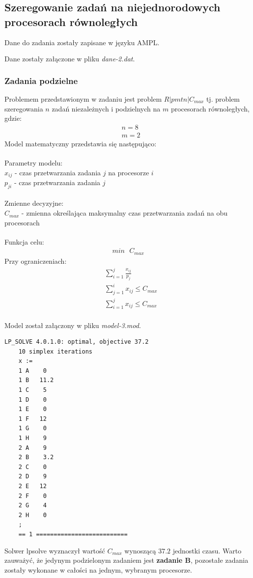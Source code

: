 \documentclass[
    12pt, %
]{../fphw}
\begin{document}
\subsection{Szeregowanie zadań na niejednorodowych procesorach równoległych}
Dane do zadania zostały zapisane w języku AMPL.

Dane zostały załączone w pliku \textit{dane-2.dat}.
\subsubsection{Zadania podzielne}
Problemem przedstawionym w zadaniu jest problem \(R|pmtn|C_{max}\)
tj. problem szeregowania \(n\) zadań niezależnych i podzielnych
na \(m\) procesorach równoległych, gdzie:
\begin{align*}
     & n = 8 \\
     & m = 2
\end{align*}
Model matematyczny przedstawia się następująco: \\ \\
Parametry modelu: \\
\(x_{ij}\) - czas przetwarzania zadania \(j\) na procesorze \(i\) \\
\(p_{ji}\) - czas przetwarzania zadania \(j\) \\ \\
Zmienne decyzyjne: \\
\(C_{max}\) - zmienna określająca maksymalny czas przetwarzania zadań na obu procesorach \\ \\
Funkcja celu: \\
\begin{align*}
    min \text{ } C_{max}
\end{align*}
Przy ograniczeniach: \\
\begin{align*}
     & \sum^j_{i=1} \frac{x_{ij}}{p_j}  \\
     & \sum^i_{j=1} x_{ij} \leq C_{max} \\
     & \sum^j_{i=1} x_{ij} \leq C_{max} \\
\end{align*}


Model został załączony w pliku \textit{model-3.mod}.


\begin{lstlisting}[caption=Rozwiązanie znalezione solwerem lpsolve]
    LP_SOLVE 4.0.1.0: optimal, objective 37.2
    10 simplex iterations
    x :=
    1 A    0
    1 B   11.2
    1 C    5
    1 D    0
    1 E    0
    1 F   12
    1 G    0
    1 H    9
    2 A    9
    2 B    3.2
    2 C    0
    2 D    9
    2 E   12
    2 F    0
    2 G    4
    2 H    0
    ;
    == 1 ==========================
\end{lstlisting}
Solwer lpsolve wyznaczył wartość \(C_{max}\) wynoszącą \(37.2\) jednostki czasu.
Warto zauważyć, że jedynym podzielonym zadaniem jest \textbf{zadanie B},
pozostałe zadania zostały wykonane w całości na jednym, wybranym procesorze.
\end{document}
